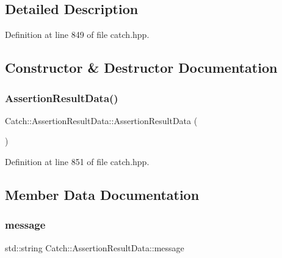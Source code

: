 \subsection{Detailed Description}


Definition at line 849 of file catch.\+hpp.



\subsection{Constructor \& Destructor Documentation}
\hypertarget{struct_catch_1_1_assertion_result_data_a37179edde9f853f22d4456677fd97701}{}\label{struct_catch_1_1_assertion_result_data_a37179edde9f853f22d4456677fd97701} 
\subsubsection{\texorpdfstring{Assertion\+Result\+Data()}{AssertionResultData()}}
{\footnotesize\ttfamily Catch\+::\+Assertion\+Result\+Data\+::\+Assertion\+Result\+Data (\begin{DoxyParamCaption}{ }\end{DoxyParamCaption})\hspace{0.3cm}{\ttfamily [inline]}}



Definition at line 851 of file catch.\+hpp.



\subsection{Member Data Documentation}
\hypertarget{struct_catch_1_1_assertion_result_data_ac34215803c4c4a88f795879f61c1f7b4}{}\label{struct_catch_1_1_assertion_result_data_ac34215803c4c4a88f795879f61c1f7b4} 
\subsubsection{\texorpdfstring{message}{message}}
{\footnotesize\ttfamily std\+::string Catch\+::\+Assertion\+Result\+Data\+::message}



